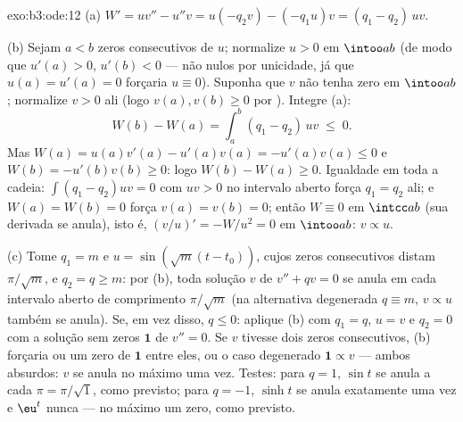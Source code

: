 \begin{solution}{exo:b3:ode:12}
(a) $W' = uv'' - u''v = u(-q_2v) - (-q_1u)v = (q_1 -
q_2)\,uv$.

(b) Sejam $a < b$ zeros consecutivos de $u$; normalize $u >
0$ em $\intoo ab$ (de modo que $u'(a) > 0$, $u'(b) < 0$ --- não nulos
por unicidade, já que $u(a) = u'(a) = 0$ forçaria $u
\equiv 0$). Suponha que $v$ não tenha zero em $\intoo ab$;
normalize $v > 0$ ali (logo $v(a), v(b) \geq 0$ por
). Integre (a):
\[
W(b) - W(a) = \int_a^b(q_1 - q_2)\,uv \;\leq\; 0 .
\]
Mas $W(a) = u(a)v'(a) - u'(a)v(a) = -u'(a)v(a) \leq 0$ e
$W(b) = -u'(b)v(b) \geq 0$: logo $W(b) - W(a) \geq 0$.
Igualdade em toda a cadeia: $\int(q_1 - q_2)uv = 0$ com $uv > 0$
no intervalo aberto força $q_1 = q_2$ ali; e $W(a) =
W(b) = 0$ força $v(a) = v(b) = 0$; então $W \equiv 0$ em
$\intcc ab$ (sua derivada se anula), isto é,
$(v/u)' = -W/u^2 = 0$ em $\intoo ab$: $v \propto u$.

(c) Tome $q_1 = m$ e $u = \sin(\sqrt m(t - t_0))$, cujos
zeros consecutivos distam $\pi/\sqrt m$, e $q_2 = q \geq
m$: por (b), toda solução $v$ de $v'' + qv = 0$ se anula em
cada intervalo aberto de comprimento $\pi/\sqrt m$ (na
alternativa degenerada $q \equiv m$, $v \propto u$ também se anula). Se, em vez disso, $q \leq 0$: aplique (b) com $q_1 = q$, $u =
v$ e $q_2 = 0$ com a solução sem zeros $\mathbf 1$ de
$v'' = 0$. Se $v$ tivesse dois zeros consecutivos, (b) forçaria
ou um zero de $\mathbf 1$ entre eles, ou o caso degenerado
$\mathbf 1 \propto v$ --- ambos absurdos: $v$ se anula no
máximo uma vez. Testes: para $q = 1$, $\sin t$ se anula a cada $\pi
= \pi/\sqrt1$, como previsto; para $q = -1$, $\sinh t$
se anula exatamente uma vez e $\eu^t$ nunca --- no máximo um
zero, como previsto.
\end{solution}

